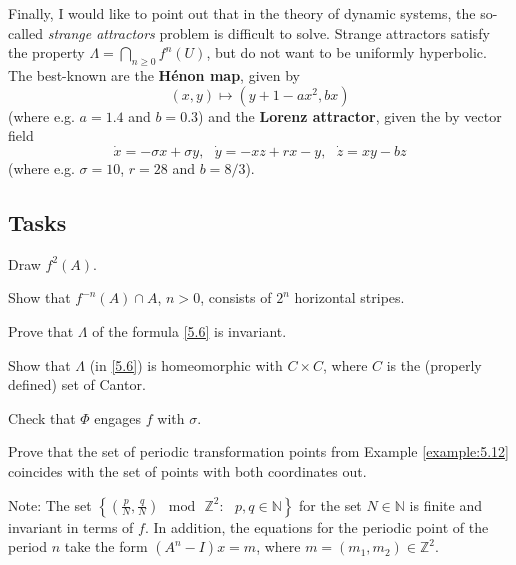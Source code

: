 Finally, I would like to point out that in the theory of dynamic systems, the so-called \emph{strange attractors} problem is difficult to solve. Strange attractors satisfy the property $\Lambda = \bigcap_{n\geq 0}f^{n}(U)$, but do not want to be uniformly hyperbolic. The best-known are the \textbf{Hénon map}, given by
$$
\left( x,y\right) \longmapsto \left( y+1-ax^{2},bx\right)
$$
(where e.g. $a=1.4$ and $b=0.3$) and the \textbf{Lorenz attractor}, given the by vector field
$$
\dot{x}=-\sigma x+\sigma y,\text{ \ }\dot{y}=-xz+rx-y,\text{ \ }\dot{z}=xy-bz
$$
(where e.g. $\sigma =10$, $r=28$ and $b=8/3$).

\subsection*{Tasks}
\begin{task}
	Draw $f^{2}(A)$.
\end{task}

\begin{task}
	Show that $f^{-n}(A)\cap A$, $n>0$, consists of $2^{n}$ horizontal stripes.
\end{task}

\begin{task}
	Prove that $\Lambda $ of the formula \eqref{5.6} is invariant.
\end{task}

\begin{task}
	Show that $\Lambda $ (in \eqref{5.6}) is homeomorphic with $C\times C$, where $C$ is the (properly defined) set of Cantor.
\end{task}

\begin{task}
	Check that $\Phi $ engages $f$ with $\sigma$.
\end{task}

\begin{task}
	Prove that the set of periodic transformation points from Example \ref{example:5.12} coincides with the set of points with both coordinates out.
	
	Note: The set $\left\{ \left( \frac{p}{N},\frac{q}{N}\right)
	\text{ }\textrm{mod}\text{ }\mathbb{Z}^{2}:\text{ }p,q\in \mathbb{N}\right\}$ for the set $N\in \mathbb{N}$ is finite and invariant in terms of $f$. In addition, the equations for the periodic point of the period $n$ take the form $\left( A^{n} - I\right) x=m$, where $m=\left(m_{1}, m_{2}\right) \in \mathbb{Z}^{2}$.
\end{task}